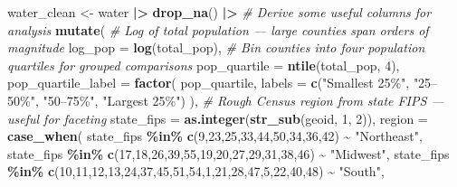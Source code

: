 \documentclass[
]{article}
\newenvironment{Shaded}{\begin{snugshade}}{\end{snugshade}}
\newcommand{\AttributeTok}[1]{\textcolor[rgb]{0.13,0.29,0.53}{#1}}
\newcommand{\CommentTok}[1]{\textcolor[rgb]{0.56,0.35,0.01}{\textit{#1}}}
\newcommand{\DecValTok}[1]{\textcolor[rgb]{0.00,0.00,0.81}{#1}}
\newcommand{\FunctionTok}[1]{\textcolor[rgb]{0.13,0.29,0.53}{\textbf{#1}}}
\newcommand{\NormalTok}[1]{#1}
\newcommand{\OtherTok}[1]{\textcolor[rgb]{0.56,0.35,0.01}{#1}}
\newcommand{\SpecialCharTok}[1]{\textcolor[rgb]{0.81,0.36,0.00}{\textbf{#1}}}
\newcommand{\StringTok}[1]{\textcolor[rgb]{0.31,0.60,0.02}{#1}}
\begin{document}
\begin{Shaded}
\begin{Highlighting}[]
\NormalTok{water\_clean }\OtherTok{\textless{}{-}}\NormalTok{ water }\SpecialCharTok{|\textgreater{}}
  \FunctionTok{drop\_na}\NormalTok{() }\SpecialCharTok{|\textgreater{}}
  \CommentTok{\# Derive some useful columns for analysis}
  \FunctionTok{mutate}\NormalTok{(}
    \CommentTok{\# Log of total population — large counties span orders of magnitude}
    \AttributeTok{log\_pop =} \FunctionTok{log}\NormalTok{(total\_pop),}
    \CommentTok{\# Bin counties into four population quartiles for grouped comparisons}
    \AttributeTok{pop\_quartile =} \FunctionTok{ntile}\NormalTok{(total\_pop, }\DecValTok{4}\NormalTok{),}
    \AttributeTok{pop\_quartile\_label =} \FunctionTok{factor}\NormalTok{(}
\NormalTok{      pop\_quartile,}
      \AttributeTok{labels =} \FunctionTok{c}\NormalTok{(}\StringTok{"Smallest 25\%"}\NormalTok{, }\StringTok{"25–50\%"}\NormalTok{, }\StringTok{"50–75\%"}\NormalTok{, }\StringTok{"Largest 25\%"}\NormalTok{)}
\NormalTok{    ),}
    \CommentTok{\# Rough Census region from state FIPS — useful for faceting}
    \AttributeTok{state\_fips =} \FunctionTok{as.integer}\NormalTok{(}\FunctionTok{str\_sub}\NormalTok{(geoid, }\DecValTok{1}\NormalTok{, }\DecValTok{2}\NormalTok{)),}
    \AttributeTok{region =} \FunctionTok{case\_when}\NormalTok{(}
\NormalTok{      state\_fips }\SpecialCharTok{\%in\%} \FunctionTok{c}\NormalTok{(}\DecValTok{9}\NormalTok{,}\DecValTok{23}\NormalTok{,}\DecValTok{25}\NormalTok{,}\DecValTok{33}\NormalTok{,}\DecValTok{44}\NormalTok{,}\DecValTok{50}\NormalTok{,}\DecValTok{34}\NormalTok{,}\DecValTok{36}\NormalTok{,}\DecValTok{42}\NormalTok{) }\SpecialCharTok{\textasciitilde{}} \StringTok{"Northeast"}\NormalTok{,}
\NormalTok{      state\_fips }\SpecialCharTok{\%in\%} \FunctionTok{c}\NormalTok{(}\DecValTok{17}\NormalTok{,}\DecValTok{18}\NormalTok{,}\DecValTok{26}\NormalTok{,}\DecValTok{39}\NormalTok{,}\DecValTok{55}\NormalTok{,}\DecValTok{19}\NormalTok{,}\DecValTok{20}\NormalTok{,}\DecValTok{27}\NormalTok{,}\DecValTok{29}\NormalTok{,}\DecValTok{31}\NormalTok{,}\DecValTok{38}\NormalTok{,}\DecValTok{46}\NormalTok{) }\SpecialCharTok{\textasciitilde{}} \StringTok{"Midwest"}\NormalTok{,}
\NormalTok{      state\_fips }\SpecialCharTok{\%in\%} \FunctionTok{c}\NormalTok{(}\DecValTok{10}\NormalTok{,}\DecValTok{11}\NormalTok{,}\DecValTok{12}\NormalTok{,}\DecValTok{13}\NormalTok{,}\DecValTok{24}\NormalTok{,}\DecValTok{37}\NormalTok{,}\DecValTok{45}\NormalTok{,}\DecValTok{51}\NormalTok{,}\DecValTok{54}\NormalTok{,}\DecValTok{1}\NormalTok{,}\DecValTok{21}\NormalTok{,}\DecValTok{28}\NormalTok{,}\DecValTok{47}\NormalTok{,}\DecValTok{5}\NormalTok{,}\DecValTok{22}\NormalTok{,}\DecValTok{40}\NormalTok{,}\DecValTok{48}\NormalTok{) }\SpecialCharTok{\textasciitilde{}} \StringTok{"South"}\NormalTok{,}

\end{Highlighting}
\end{Shaded}
\end{document}
